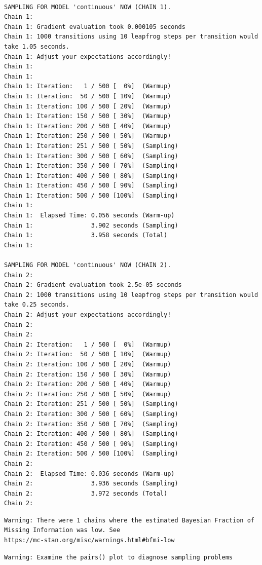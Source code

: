 \documentclass[
  letterpaper,
  DIV=11,
  numbers=noendperiod]{scrartcl}
\begin{document}
\begin{verbatim}

SAMPLING FOR MODEL 'continuous' NOW (CHAIN 1).
Chain 1: 
Chain 1: Gradient evaluation took 0.000105 seconds
Chain 1: 1000 transitions using 10 leapfrog steps per transition would take 1.05 seconds.
Chain 1: Adjust your expectations accordingly!
Chain 1: 
Chain 1: 
Chain 1: Iteration:   1 / 500 [  0%]  (Warmup)
Chain 1: Iteration:  50 / 500 [ 10%]  (Warmup)
Chain 1: Iteration: 100 / 500 [ 20%]  (Warmup)
Chain 1: Iteration: 150 / 500 [ 30%]  (Warmup)
Chain 1: Iteration: 200 / 500 [ 40%]  (Warmup)
Chain 1: Iteration: 250 / 500 [ 50%]  (Warmup)
Chain 1: Iteration: 251 / 500 [ 50%]  (Sampling)
Chain 1: Iteration: 300 / 500 [ 60%]  (Sampling)
Chain 1: Iteration: 350 / 500 [ 70%]  (Sampling)
Chain 1: Iteration: 400 / 500 [ 80%]  (Sampling)
Chain 1: Iteration: 450 / 500 [ 90%]  (Sampling)
Chain 1: Iteration: 500 / 500 [100%]  (Sampling)
Chain 1: 
Chain 1:  Elapsed Time: 0.056 seconds (Warm-up)
Chain 1:                3.902 seconds (Sampling)
Chain 1:                3.958 seconds (Total)
Chain 1: 

SAMPLING FOR MODEL 'continuous' NOW (CHAIN 2).
Chain 2: 
Chain 2: Gradient evaluation took 2.5e-05 seconds
Chain 2: 1000 transitions using 10 leapfrog steps per transition would take 0.25 seconds.
Chain 2: Adjust your expectations accordingly!
Chain 2: 
Chain 2: 
Chain 2: Iteration:   1 / 500 [  0%]  (Warmup)
Chain 2: Iteration:  50 / 500 [ 10%]  (Warmup)
Chain 2: Iteration: 100 / 500 [ 20%]  (Warmup)
Chain 2: Iteration: 150 / 500 [ 30%]  (Warmup)
Chain 2: Iteration: 200 / 500 [ 40%]  (Warmup)
Chain 2: Iteration: 250 / 500 [ 50%]  (Warmup)
Chain 2: Iteration: 251 / 500 [ 50%]  (Sampling)
Chain 2: Iteration: 300 / 500 [ 60%]  (Sampling)
Chain 2: Iteration: 350 / 500 [ 70%]  (Sampling)
Chain 2: Iteration: 400 / 500 [ 80%]  (Sampling)
Chain 2: Iteration: 450 / 500 [ 90%]  (Sampling)
Chain 2: Iteration: 500 / 500 [100%]  (Sampling)
Chain 2: 
Chain 2:  Elapsed Time: 0.036 seconds (Warm-up)
Chain 2:                3.936 seconds (Sampling)
Chain 2:                3.972 seconds (Total)
Chain 2: 
\end{verbatim}

\begin{verbatim}
Warning: There were 1 chains where the estimated Bayesian Fraction of Missing Information was low. See
https://mc-stan.org/misc/warnings.html#bfmi-low
\end{verbatim}

\begin{verbatim}
Warning: Examine the pairs() plot to diagnose sampling problems
\end{verbatim}
\end{document}
